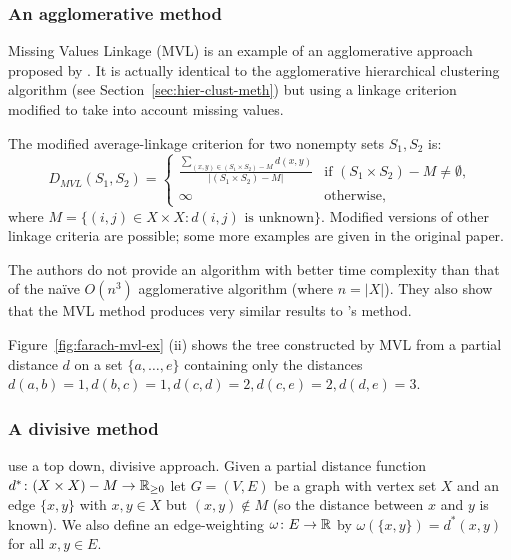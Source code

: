\subsubsection{An agglomerative method}
\label{sec:part-dist-agglom-method}

Missing Values Linkage (MVL) is an example of an agglomerative approach
proposed by \cite{schader1992mvl}.  It is actually identical to the
agglomerative hierarchical clustering algorithm (see
Section~\ref{sec:hier-clust-meth}) but using a linkage criterion modified to
take into account missing values.

The modified
average-linkage criterion for two nonempty sets $S_1, S_2$ is:
\begin{equation*}
  D_{MVL}(S_1,S_2) =
  \begin{cases}
    \displaystyle
    \frac{\displaystyle \sum_{(x,y) \in (S_1 \times S_2) - M} d(x,y)}
         {|(S_1 \times S_2) - M|} & \text{if $(S_1
      \times S_2) - M \neq \emptyset$,} \\
    \infty & \text{otherwise},
  \end{cases}
\end{equation*}
where $M = \{(i,j) \in X \times X \colon d(i,j) \text{ is unknown}\}$.
Modified versions of other linkage criteria are possible; some more examples
are given in the original paper.

The authors do not provide an algorithm with better time complexity than that
of the naïve $O(n^3)$ agglomerative algorithm (where $n = |X|$).  They also
show that the MVL method produces very similar results to
\citeauthor{de1984ultrametric}'s method.

Figure~\ref{fig:farach-mvl-ex} (ii) shows the tree constructed by MVL from a
partial distance $d$ on a set $\{a,\dotsc,e\}$ containing only the distances
$d(a,b)=1, d(b,c)=1, d(c,d)=2, d(c,e)=2, d(d,e)=3$.

\subsubsection{A divisive method}
\label{sec:part-dist-divisive-method}

\citet{farach1995robust} use a top down, divisive approach.  Given a partial
distance function $d^* \colon (X \times X) - M \to {\mathbb R}_{\geq 0}$ let $G=(V,E)$ be a
graph with vertex set $X$ and an edge $\{x,y\}$ with $x,y \in X$ but $(x,y)
\notin M$ (so the distance between $x$ and $y$ is known).  We also define an
edge-weighting $\omega \colon E \to {\mathbb R}$ by $\omega(\{x,y\}) = d^*(x,y)$ for
all $x,y \in E$.


